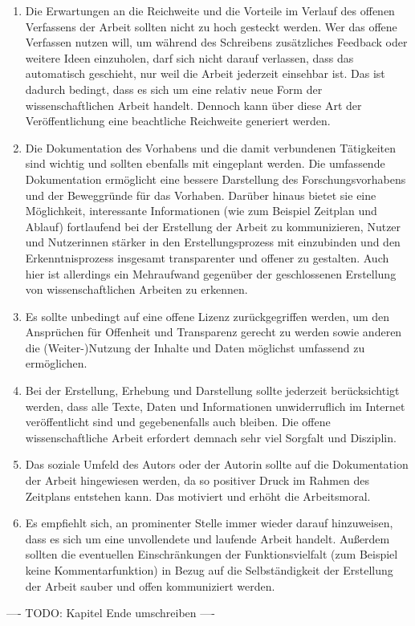 \begin{enumerate}
\item Die Erwartungen an die Reichweite und die Vorteile im Verlauf des offenen Verfassens der Arbeit sollten nicht zu hoch gesteckt werden. Wer das offene Verfassen nutzen will, um während des Schreibens zusätzliches Feedback oder weitere Ideen einzuholen, darf sich nicht darauf verlassen, dass das automatisch geschieht, nur weil die Arbeit jederzeit einsehbar ist. Das ist dadurch bedingt, dass es sich um eine relativ neue Form der wissenschaftlichen Arbeit handelt. Dennoch kann über diese Art der Veröffentlichung eine beachtliche Reichweite generiert werden.
\item Die Dokumentation des Vorhabens und die damit verbundenen Tätigkeiten sind wichtig und sollten ebenfalls mit eingeplant werden. Die umfassende Dokumentation ermöglicht eine bessere Darstellung des Forschungsvorhabens und der Beweggründe für das Vorhaben. Darüber hinaus bietet sie eine Möglichkeit, interessante Informationen (wie zum Beispiel Zeitplan und Ablauf) fortlaufend bei der Erstellung der Arbeit zu kommunizieren, Nutzer und Nutzerinnen stärker in den Erstellungsprozess mit einzubinden und den Erkenntnisprozess insgesamt transparenter und offener zu gestalten. Auch hier ist allerdings ein Mehraufwand gegenüber der geschlossenen Erstellung von wissenschaftlichen Arbeiten zu erkennen.
\item Es sollte unbedingt auf eine offene Lizenz zurückgegriffen werden, um den Ansprüchen für Offenheit und Transparenz gerecht zu werden sowie anderen die (Weiter-)Nutzung der Inhalte und Daten möglichst umfassend zu ermöglichen.
\item Bei der Erstellung, Erhebung und Darstellung sollte jederzeit berücksichtigt werden, dass alle Texte, Daten und Informationen unwiderruflich im Internet veröffentlicht sind und gegebenenfalls auch bleiben. Die offene wissenschaftliche Arbeit erfordert demnach sehr viel Sorgfalt und Disziplin.
\item Das soziale Umfeld des Autors oder der Autorin sollte auf die Dokumentation der Arbeit hingewiesen werden, da so positiver Druck im Rahmen des Zeitplans entstehen kann. Das motiviert und erhöht die Arbeitsmoral.
\item Es empfiehlt sich, an prominenter Stelle immer wieder darauf hinzuweisen, dass es sich um eine unvollendete und laufende Arbeit handelt. Außerdem sollten die eventuellen Einschränkungen der Funktionsvielfalt (zum Beispiel keine Kommentarfunktion) in Bezug auf die Selbständigkeit der Erstellung der Arbeit sauber und offen kommuniziert werden.
\end{enumerate}

---- TODO: Kapitel Ende umschreiben ----
